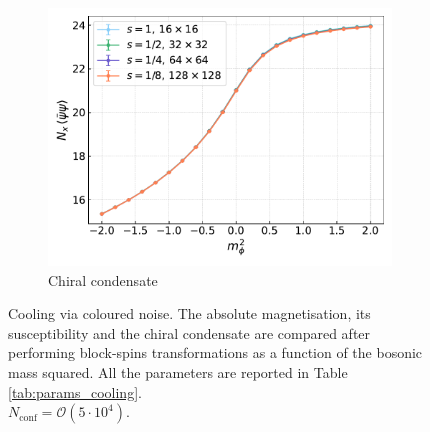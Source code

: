 \begin{figure}[hbp]
\begin{subfigure}[b]{0.49\textwidth}
        \includegraphics[width=\textwidth]{figures/cooling/mass_scan/condensate.pdf}
        \caption{Chiral condensate}
    \end{subfigure}
    \caption[Cooling stochastic quantisation: fields as a function of the bosonic mass squared.]{Cooling via coloured noise. The absolute magnetisation, its susceptibility and the chiral condensate are compared after performing block-spins transformations as a function of the bosonic mass squared. All the parameters are reported in  Table \ref{tab:params_cooling}. \\ $N_\text{conf} = \mathcal{O}(5 \cdot 10^4)$.}
    \label{fig:cooling_M_psibarpsi_chi2}
\end{figure}

